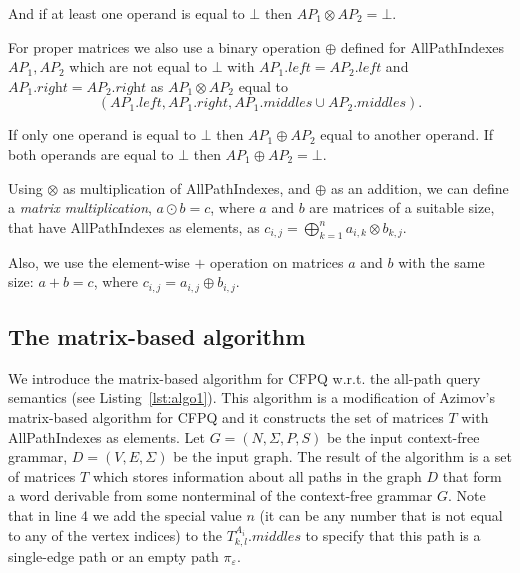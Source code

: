 And if at least one operand is equal to $\bot$ then $AP_1 \otimes AP_2 = \bot$.

For proper matrices we also use a binary operation $\oplus$ defined for AllPathIndexes \mbox{$AP_1, AP_2$} which are not equal to $\bot$ with $AP_1.\textit{left} = AP_2.\textit{left}$ and $AP_1.\textit{right} = AP_2.\textit{right}$ as $AP_1 \otimes AP_2$ equal to
	$$(AP_1.left, AP_1.right, AP_1.middles \cup AP_2.middles).$$
	
If only one operand is equal to $\bot$ then $AP_1 \oplus AP_2$ equal to another operand. If both operands are equal to $\bot$ then $AP_1 \oplus AP_2 = \bot$.

Using $\otimes$ as multiplication of AllPathIndexes, and $\oplus$ as an addition, we can define a \emph{matrix multiplication}, \mbox{$a \odot b = c$}, where $a$ and $b$ are matrices of a suitable size, that have AllPathIndexes as elements, as $c_{i,j} = \bigoplus^{n}_{k=1}{a_{i,k} \otimes b_{k,j}}.$

Also, we use the element-wise $+$ operation on matrices $a$ and $b$ with the same size: \mbox{$a + b = c$}, where $c_{i,j} = a_{i,j} \oplus b_{i,j}.$


\subsection{The matrix-based algorithm}
We introduce the matrix-based algorithm for CFPQ w.r.t. the all-path query semantics (see Listing~\ref{lst:algo1}). This algorithm is a modification of Azimov's matrix-based algorithm for CFPQ and it constructs the set of matrices $T$ with AllPathIndexes as elements.
Let $G = (N, \Sigma, P, S)$ be the input context-free grammar, $D = (V, E, \Sigma)$ be the input graph.
The result of the algorithm is a set of matrices $T$ which stores information about all paths in the graph $D$ that form a word derivable from some nonterminal of the context-free grammar $G$. Note that in line 4 we add the special value $n$ (it can be any number that is not equal to any of the vertex indices) to the $T^{A_i}_{k,l}.middles$ to specify that this path is a single-edge path or an empty path $\pi_{\varepsilon}$.

